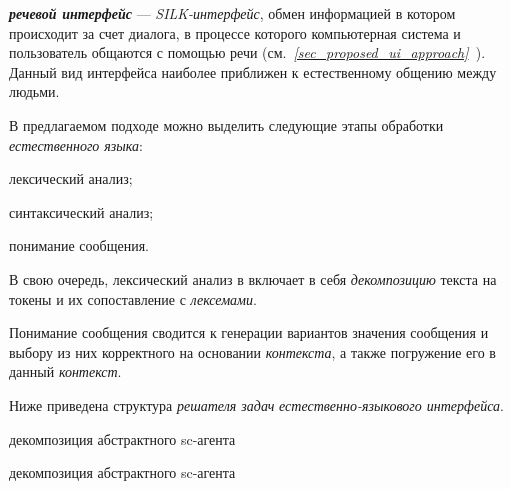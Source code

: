 \begin{SCn}


\end{SCn}

\textbf{\textit{речевой интерфейс}} --- \textit{SILK-интерфейс}, обмен информацией в котором происходит за счет диалога, в процессе которого компьютерная система и пользователь общаются с помощью речи (см.~\textit{\ref{sec_proposed_ui_approach}~}).
Данный вид интерфейса наиболее приближен к естественному общению между людьми.

В предлагаемом подходе можно выделить следующие этапы обработки \textit{естественного языка}:
\begin{textitemize}
    \item лексический анализ;
    \item синтаксический анализ;
    \item понимание сообщения.
\end{textitemize}

В свою очередь, лексический анализ в включает в себя \textit{декомпозицию} текста на токены и их сопоставление с \textit{лексемами}.

Понимание сообщения сводится к генерации вариантов значения сообщения и выбору из них корректного на основании \textit{контекста}, а также погружение его в данный \textit{контекст}.

Ниже приведена структура \textit{решателя задач} \textit{естественно-языкового интерфейса}.

\begin{SCn}

    \begin{scnrelfromset}{декомпозиция абстрактного sc-агента}
        \begin{scnindent}
            \begin{scnrelfromset}{декомпозиция абстрактного sc-агента}
            \end{scnrelfromset}
        \end{scnindent}
    \end{scnrelfromset}

\end{SCn}

